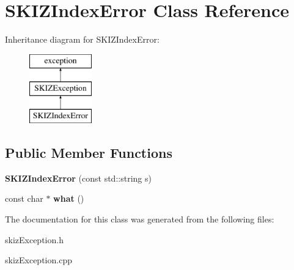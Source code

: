 \hypertarget{classSKIZIndexError}{}\section{S\+K\+I\+Z\+Index\+Error Class Reference}
\label{classSKIZIndexError}
Inheritance diagram for S\+K\+I\+Z\+Index\+Error\+:\begin{figure}[H]
\begin{center}
\leavevmode
\includegraphics[height=3.000000cm]{classSKIZIndexError}
\end{center}
\end{figure}
\subsection*{Public Member Functions}
\begin{DoxyCompactItemize}
\item 
\mbox{\label{classSKIZIndexError_acd2f2881624d3e82d92c174478fdd41f}} 
{\bfseries S\+K\+I\+Z\+Index\+Error} (const std\+::string s)
\item 
\mbox{\label{classSKIZIndexError_afe5aecca16fd1cd1d2d5221b1623dc11}} 
const char $\ast$ {\bfseries what} ()
\end{DoxyCompactItemize}


The documentation for this class was generated from the following files\+:\begin{DoxyCompactItemize}
\item 
skiz\+Exception.\+h\item 
skiz\+Exception.\+cpp\end{DoxyCompactItemize}
